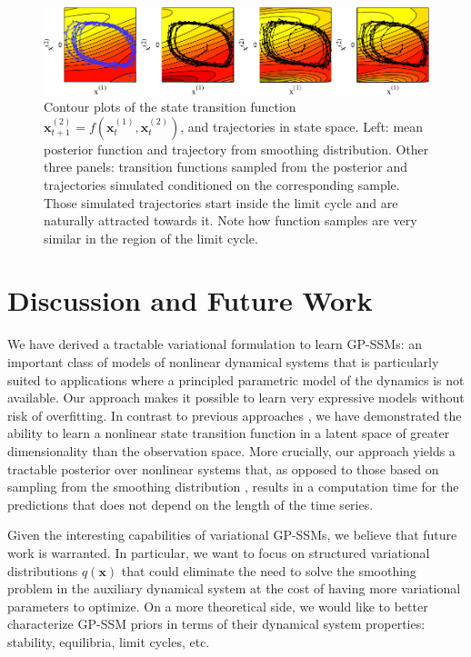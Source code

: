 \documentclass{article} %
\newcommand{\x}{\mathbf{x}}
\begin{document}
\begin{figure}[tb]
\centering
\includegraphics[width=13cm]{contourandtrajh.pdf}
\vspace{-0.3cm}
\caption{Contour plots of the state transition function $\x_{t+1}^{(2)} = f(\x_{t}^{(1)},\x_{t}^{(2)})$, and trajectories in state space. Left: mean posterior function and trajectory from smoothing distribution. Other three panels: transition functions sampled from the posterior and trajectories simulated conditioned on the corresponding sample. Those simulated trajectories start inside the limit cycle and are naturally attracted towards it. Note how function samples are very similar in the region of the limit cycle.}
\vspace{-0.3cm}
\label{fig:contourandtraj}
\end{figure}




\section{Discussion and Future Work}

We have derived a tractable variational formulation to learn GP-SSMs: an important class of models of nonlinear dynamical systems that is particularly suited to applications where a principled parametric model of the dynamics is not available. Our approach makes it possible to learn very expressive models without risk of overfitting. In contrast to previous approaches \citep{Damianou2011,Lawrence2007,Wang2006}, we have demonstrated the ability to learn a nonlinear state transition function in a latent space of greater dimensionality than the observation space. More crucially, our approach yields a tractable posterior over nonlinear systems that, as opposed to those based on sampling from the smoothing distribution \citep{FriLinSchRas13}, results in a computation time for the predictions that does not depend on the length of the time series.

Given the interesting capabilities of variational GP-SSMs, we believe that future work is warranted. In particular, we want to focus on structured variational distributions $q(\x)$ that could eliminate the need to solve the smoothing problem in the auxiliary dynamical system at the cost of having more variational parameters to optimize. On a more theoretical side, we would like to better characterize GP-SSM priors in terms of their dynamical system properties: stability, equilibria, limit cycles, etc.
\end{document}
